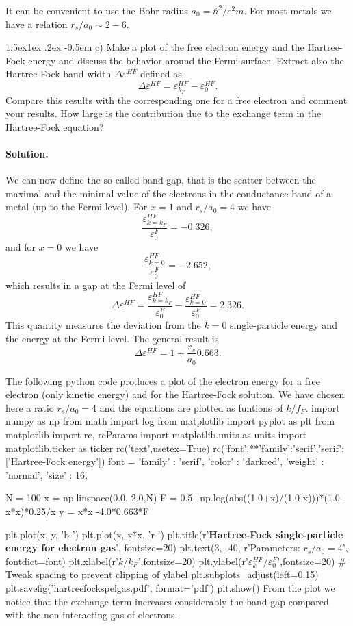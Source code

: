 \documentclass[%
oneside,                 %
final,                   %
10pt]{article}
\makeatletter
\newenvironment{doconceexercise}{}{}
\newcommand\subex{\@startsection{paragraph}{4}{\z@}%
                  {1.5ex\@plus1ex \@minus.2ex}%
                  {-0.5em}%
                  {\normalfont\normalsize\bfseries}}
\makeatother
\begin{document}
\begin{doconceexercise}

It can be convenient to use the Bohr radius $a_0=\hbar^2/e^2m$.
For most metals we have a relation $r_s/a_0\sim 2-6$.

\subex{c)}
Make a plot of the free electron energy and the Hartree-Fock energy and discuss the behavior around the Fermi surface. Extract also   the Hartree-Fock band width $\Delta\varepsilon^{HF}$ defined as
\[ 
\Delta\varepsilon^{HF}=\varepsilon_{k_{F}}^{HF}-
\varepsilon_{0}^{HF}.
\]
Compare this results with the corresponding one for a free electron and comment your results. How large is the contribution due to the exchange term in the Hartree-Fock equation?


\paragraph{Solution.}
We can now define the so-called band gap, that is the scatter between the maximal and the minimal value of the electrons in the conductance band of a metal (up to the Fermi level). 
For $x=1$ and $r_s/a_0=4$ we have 
\[
\frac{\varepsilon_{k=k_F}^{HF} }{\varepsilon_{0}^{F}} = -0.326,
\]
and for $x=0$ we have
\[
\frac{\varepsilon_{k=0}^{HF} }{\varepsilon_{0}^{F}} = -2.652,
\]
which results in a gap at the Fermi level of 
\[
\Delta \varepsilon^{HF} = \frac{\varepsilon_{k=k_F}^{HF} }{\varepsilon_{0}^{F}}-\frac{\varepsilon_{k=0}^{HF} }{\varepsilon_{0}^{F}} = 2.326.
\]
This quantity measures the deviation from the $k=0$ single-particle energy and the energy at the Fermi level.
The general result is 
\[
\Delta \varepsilon^{HF} = 1+\frac{r_s}{a_0}0.663.
\]

The following python code produces a plot of the electron energy for a free electron (only kinetic energy) and 
for the Hartree-Fock solution. We have chosen here a ratio $r_s/a_0=4$ and the equations are plotted as funtions
of $k/f_F$. 
\bpycod
import numpy as np
from math import log
from  matplotlib import pyplot as plt
from matplotlib import rc, rcParams
import matplotlib.units as units
import matplotlib.ticker as ticker
rc('text',usetex=True)
rc('font',**{'family':'serif','serif':['Hartree-Fock energy']})
font = {'family' : 'serif',
        'color'  : 'darkred',
        'weight' : 'normal',
        'size'   : 16,
        }

N = 100
x = np.linspace(0.0, 2.0,N)
F = 0.5+np.log(abs((1.0+x)/(1.0-x)))*(1.0-x*x)*0.25/x
y = x*x -4.0*0.663*F

plt.plot(x, y, 'b-')
plt.plot(x, x*x, 'r-')
plt.title(r'{\bf Hartree-Fock single-particle energy for electron gas}', fontsize=20)     
plt.text(3, -40, r'Parameters: $r_s/a_0=4$', fontdict=font)
plt.xlabel(r'$k/k_F$',fontsize=20)
plt.ylabel(r'$\varepsilon_k^{HF}/\varepsilon_0^F$',fontsize=20)
# Tweak spacing to prevent clipping of ylabel
plt.subplots_adjust(left=0.15)
plt.savefig('hartreefockspelgas.pdf', format='pdf')
plt.show()
\epycod
From the plot we notice that the exchange term increases considerably the band gap
compared with the non-interacting gas of electrons.


\end{doconceexercise}
\end{document}
